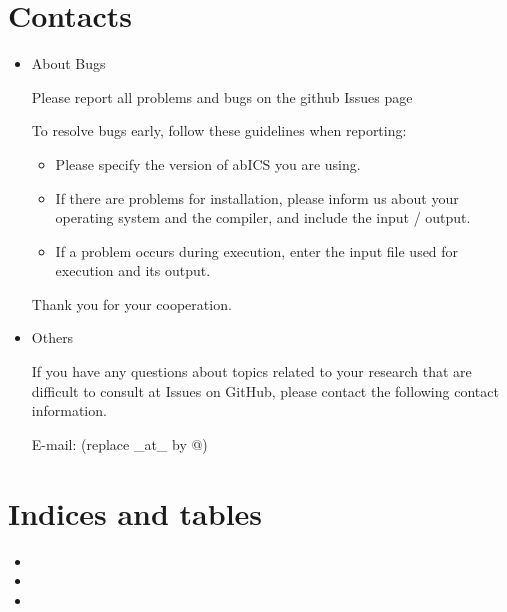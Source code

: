 \documentclass[letterpaper,10pt,english]{sphinxmanual}
\begin{document}
\chapter{Contacts}
\label{\detokenize{contact/index::doc}}\label{\detokenize{contact/index:contacts}}\begin{itemize}
\item {} 
About Bugs

Please report all problems and bugs on the github Issues page

To resolve bugs early, follow these guidelines when reporting:
\begin{itemize}
\item {} 
Please specify the version of abICS you are using.

\item {} 
If there are problems for installation, please inform us about your operating system and the compiler, and include the input / output.

\item {} 
If a problem occurs during execution, enter the input file used for execution and its output.

\end{itemize}

Thank you for your cooperation.

\item {} 
Others

If you have any questions about topics related to your research that are difficult to consult at Issues on GitHub, please contact the following contact information.

E-mail:  (replace \_at\_ by @)

\end{itemize}


\chapter{Indices and tables}
\label{\detokenize{index:indices-and-tables}}\begin{itemize}
\item {} 

\item {} 

\item {} 

\end{itemize}



\renewcommand{\indexname}{Index}
\printindex
\end{document}
